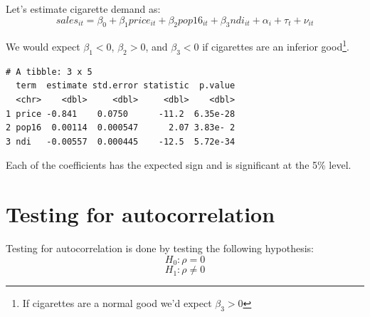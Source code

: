 \documentclass[]{book}
\newenvironment{Shaded}{\begin{snugshade}}{\end{snugshade}}
\newcommand{\CommentTok}[1]{\textcolor[rgb]{0.56,0.35,0.01}{\textit{#1}}}
\newcommand{\DataTypeTok}[1]{\textcolor[rgb]{0.13,0.29,0.53}{#1}}
\newcommand{\KeywordTok}[1]{\textcolor[rgb]{0.13,0.29,0.53}{\textbf{#1}}}
\newcommand{\NormalTok}[1]{#1}
\newcommand{\OperatorTok}[1]{\textcolor[rgb]{0.81,0.36,0.00}{\textbf{#1}}}
\newcommand{\StringTok}[1]{\textcolor[rgb]{0.31,0.60,0.02}{#1}}
\let\rmarkdownfootnote\footnote%
\def\footnote{\protect\rmarkdownfootnote}
\begin{document}
Let's estimate cigarette demand as: \[sales_{it}=\beta_0+\beta_1price_{it}+\beta_2pop16_{it}+\beta_3ndi_{it}+\alpha_i+\tau_t+\nu_{it}\]

We would expect \(\beta_1<0\), \(\beta_2>0\), and \(\beta_3<0\) if cigarettes are an inferior good\footnote{If cigarettes are a normal good we'd expect \(\beta_3>0\)}.

\begin{Shaded}
\end{Shaded}

\begin{verbatim}
# A tibble: 3 x 5
  term  estimate std.error statistic  p.value
  <chr>    <dbl>     <dbl>     <dbl>    <dbl>
1 price -0.841    0.0750      -11.2  6.35e-28
2 pop16  0.00114  0.000547      2.07 3.83e- 2
3 ndi   -0.00557  0.000445    -12.5  5.72e-34
\end{verbatim}

Each of the coefficients has the expected sign and is significant at the 5\% level.

\hypertarget{testing-for-autocorrelation}{%
\section{Testing for autocorrelation}\label{testing-for-autocorrelation}}

Testing for autocorrelation is done by testing the following hypothesis: \[H_0:\rho=0\] \[H_1:\rho\ne0\]

\begin{Shaded}
\end{Shaded}
\end{document}

